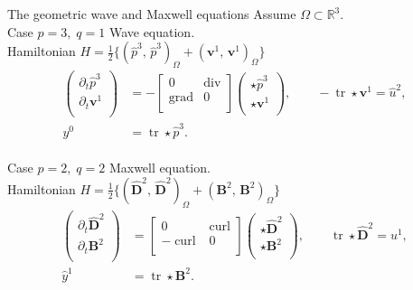\documentclass[aspectratio=169]{beamer}
\DeclareMathOperator*{\grad}{grad}
\renewcommand{\div}{\operatorname{div}}
\DeclareMathOperator*{\curl}{curl}
\DeclareMathOperator{\tr}{tr}
\newcommand{\bbR}{\mathbb{R}}
\newcommand{\inpr}[3][]{\ensuremath{( #2, \, #3 )_{#1}}}
\newcommand*{\dual}[1]{\ensuremath{\widehat{#1}}}
\begin{document}
	\begin{frame}{The geometric wave and Maxwell equations}
		Assume $\Omega \subset \bbR^3$. \\
		Case $p=3, \; q=1$ Wave equation. \\
		Hamiltonian $H= \frac{1}{2}\{\inpr[\Omega]{\dual{p}^3}{\dual{p}^3}+ \inpr[\Omega]{\bm{v}^1}{\bm{v}^1}\}$
		\begin{equation*}
			\begin{aligned}
				\begin{pmatrix}
					\partial_t \dual{p}^3 \\
					\partial_t \bm{v}^1\\
				\end{pmatrix} &= 
				-\begin{bmatrix}
					0 & \div \\
					\grad & 0 \\
				\end{bmatrix}
				\begin{pmatrix}
					\star \dual{p}^3\\
					\star \bm{v}^1\\
				\end{pmatrix}, \qquad -\tr \star \bm{v}^1= \dual{u}^{2}, \\
				y^{0} &= \tr \star \dual{p}^3.
			\end{aligned}	
		\end{equation*}
		\vspace{.5cm}\\
		Case $p=2, \;q=2$ Maxwell equation.\\
		Hamiltonian $H= \frac{1}{2}\{\inpr[\Omega]{\dual{\bm{D}}^2}{\dual{\bm{D}}^2}+ \inpr[\Omega]{\bm{B}^2}{\bm{B}^2}\}$
		\begin{equation*}
			\begin{aligned}
				\begin{pmatrix}
					\partial_t \dual{\bm{D}}^2 \\
					\partial_t \bm{B}^2\\
				\end{pmatrix} &= 
				\begin{bmatrix}
					0 & \curl \\
					-\curl & 0 \\
				\end{bmatrix}
				\begin{pmatrix}
					\star \dual{\bm{D}}^2 \\
					\star \bm{B}^2 \\
				\end{pmatrix}, \qquad \tr \star \dual{\bm{D}}^2 = u^{1}, \\
				\dual{y}^{1} &= \tr \star \bm{B}^2. 
			\end{aligned}	
		\end{equation*}
		
	\end{frame}
	
\end{document}
